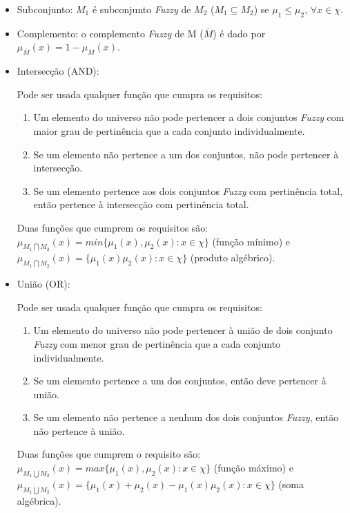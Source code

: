 \begin{itemize}
  \item Subconjunto: $M_1$ é subconjunto \textit{Fuzzy} de $M_2$ ($M_1
  \subseteq M_2$) se $\mu_1 \leq \mu_2$, $\forall x \in \chi$.
  
  \item Complemento: o complemento \textit{Fuzzy} de M ($\overline{M}$) é dado
  por $\mu_{\overline{M}}(x) = 1 - \mu_M (x)$.
  
  \item Intersecção (AND): 
  
  Pode ser usada qualquer função que cumpra os requisitos:  
  \begin{enumerate}
    \item Um elemento do universo não pode pertencer a dois conjuntos
    \textit{Fuzzy} com maior grau de pertinência que a cada conjunto
    individualmente.
    \item Se um elemento não pertence a um dos conjuntos, não pode pertencer à
    intersecção. 
    \item Se um elemento pertence aos dois conjuntos \textit{Fuzzy} com
    pertinência total, então pertence à intersecção com pertinência total. 
  \end{enumerate}

Duas funções que cumprem os requisitos são: $\mu_{M_1 \bigcap M_2}(x) =
min\{\mu_1(x),\mu_2(x): x \in \chi\}$ (função mínimo) e $\mu_{M_1 \bigcap
M_2}(x) = \{\mu_1(x)\mu_2(x): x \in \chi\}$ (produto algébrico).  
  
  \item União (OR):
  
  Pode ser usada qualquer função que cumpra os requisitos:
  \begin{enumerate}
    \item Um elemento do universo não pode pertencer à união de dois conjunto
    \textit{Fuzzy} com menor grau de pertinência que a cada conjunto
    individualmente.
    \item Se um elemento pertence a um dos conjuntos, então deve pertencer à
    união. 
    \item Se um elemento não pertence a nenhum dos dois conjuntos
    \textit{Fuzzy}, então não pertence à união.
  \end{enumerate}
  
Duas funções que cumprem o requisito são: $\mu_{M_1 \bigcup M_2}(x) =
max\{\mu_1(x),\mu_2(x): x \in \chi\}$ (função máximo) e $\mu_{M_1 \bigcup
M_2}(x) = \{\mu_1(x) + \mu_2(x) - \mu_1(x)\mu_2(x): x \in \chi\}$ (soma
algébrica).
\end{itemize}


